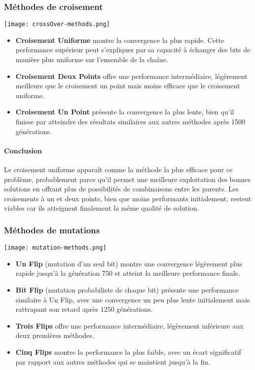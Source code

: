 \documentclass{article}
\begin{document}
\subsubsection{Méthodes de croisement}
\texttt{[image: crossOver-methods.png]}

\begin{itemize}
    \item \textbf{Croisement Uniforme} montre la convergence la plus rapide. Cette performance supérieur peut s'expliquer par sa capacité à échanger des bits de manière plus uniforme sur l'ensemble de la chaîne.

    \item \textbf{Croisement Deux Points} offre une performance intermédiaire, légèrement meilleure que le croisement un point mais moins efficace que le croisement uniforme.

    \item \textbf{Croisement Un Point} présente la convergence la plus lente, bien qu'il finisse par atteindre des résultats similaires aux autres méthodes après 1500 générations.
\end{itemize}

\paragraph{Conclusion} Le croisement uniforme apparaît comme la méthode la plus efficace pour ce problème, probablement parce qu'il permet une meilleure exploitation des bonnes solutions en offrant plus de possibilités de combinaisons entre les parents. Les croisements à un et deux points, bien que moins performants initialement, restent viables car ils atteignent finalement la même qualité de solution.

\subsubsection{Méthodes de mutations}

\texttt{[image: mutation-methods.png]}

\begin{itemize}
    \item \textbf{Un Flip} (mutation d'un seul bit) montre une convergence légèrement plus rapide jusqu'à la génération 750 et atteint la meilleure performance finale.

    \item \textbf{Bit Flip} (mutation probabiliste de chaque bit) présente une performance similaire à Un Flip, avec une convergence un peu plus lente initialement mais rattrapant son retard après 1250 générations.

    \item \textbf{Trois Flips} offre une performance intermédiaire, légèrement inférieure aux deux premières méthodes.

    \item \textbf{Cinq Flips} montre la performance la plus faible, avec un écart significatif par rapport aux autres méthodes qui se maintient jusqu'à la fin.
\end{itemize}
\end{document}
